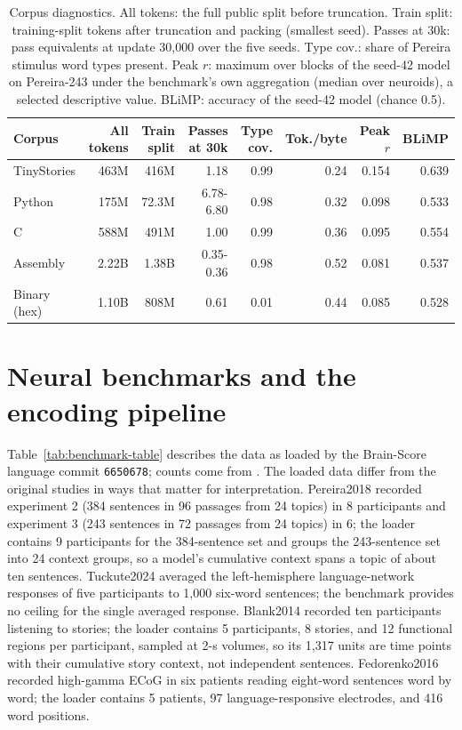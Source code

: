 \documentclass[mlmain]{jmlr}
\begin{document}
\begin{table}[htbp]
  \centering
  \caption{Corpus diagnostics. All tokens: the full public split before truncation. Train split: training-split tokens after truncation and packing (smallest seed). Passes at 30k: pass equivalents at update 30,000 over the five seeds. Type cov.: share of Pereira stimulus word types present. Peak $r$: maximum over blocks of the seed-42 model on Pereira-243 under the benchmark's own aggregation (median over neuroids), a selected descriptive value. BLiMP: accuracy of the seed-42 model (chance 0.5).}
  \label{tab:corpora}
  \small
  \setlength{\tabcolsep}{4pt}
  \begin{tabular}{lrrrrrrr}
\toprule
Corpus & All tokens & Train split & Passes at 30k & Type cov. & Tok./byte & Peak $r$ & BLiMP \\
\midrule
TinyStories & 463M & 416M & 1.18 & 0.99 & 0.24 & 0.154 & 0.639 \\
Python & 175M & 72.3M & 6.78-6.80 & 0.98 & 0.32 & 0.098 & 0.533 \\
C & 588M & 491M & 1.00 & 0.99 & 0.36 & 0.095 & 0.554 \\
Assembly & 2.22B & 1.38B & 0.35-0.36 & 0.98 & 0.52 & 0.081 & 0.537 \\
Binary (hex) & 1.10B & 808M & 0.61 & 0.01 & 0.44 & 0.085 & 0.528 \\
\bottomrule
\end{tabular}
\end{table}

\section{Neural benchmarks and the encoding pipeline}
\label{app:benchmarks}

Table~\ref{tab:benchmark-table} describes the data as loaded by the Brain-Score language commit \texttt{6650678}; counts come from . The loaded data differ from the original studies in ways that matter for interpretation. Pereira2018 \citep{pereira2018universal} recorded experiment 2 (384 sentences in 96 passages from 24 topics) in 8 participants and experiment 3 (243 sentences in 72 passages from 24 topics) in 6; the loader contains 9 participants for the 384-sentence set and groups the 243-sentence set into 24 context groups, so a model's cumulative context spans a topic of about ten sentences. Tuckute2024 \citep{tuckute2024driving} averaged the left-hemisphere language-network responses of five participants to 1,000 six-word sentences; the benchmark provides no ceiling for the single averaged response. Blank2014 \citep{blank2014dissociation} recorded ten participants listening to stories; the loader contains 5 participants, 8 stories, and 12 functional regions per participant, sampled at 2-s volumes, so its 1,317 units are time points with their cumulative story context, not independent sentences. Fedorenko2016 \citep{fedorenko2016ecog} recorded high-gamma ECoG in six patients reading eight-word sentences word by word; the loader contains 5 patients, 97 language-responsive electrodes, and 416 word positions.
\end{document}
